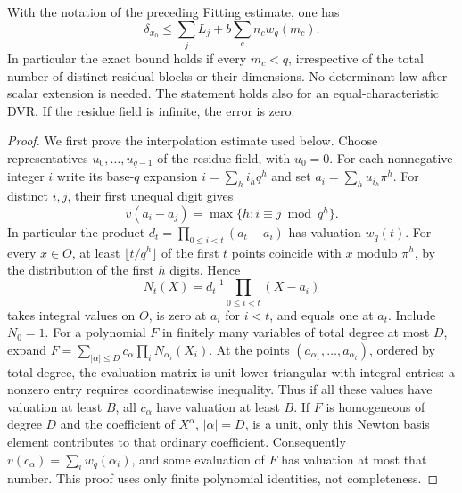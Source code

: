 \begin{theorem}
\label{thm:fitting-multiplicity}
With the notation of the preceding Fitting estimate, one has
\[
 \delta_{x_0}\le\sum_j L_j+
                   b\sum_c n_c w_q(m_c).                 \tag{MF1}
\]
In particular the exact bound holds if every \(m_c<q\), irrespective
of the total number of distinct residual blocks or their dimensions.
No determinant law after scalar extension is needed. The statement
holds also for an equal-characteristic DVR. If the residue field
is infinite, the error is zero.
\end{theorem}
\begin{proof}
We first prove the interpolation estimate used below. Choose representatives
\(u_0,\ldots,u_{q-1}\) of the residue field, with \(u_0=0\).
For each nonnegative integer \(i\) write its base-\(q\) expansion
\(i=\sum_h i_hq^h\) and set \(a_i=\sum_h u_{i_h}\pi^h\).
For distinct \(i,j\), their first unequal digit gives
\[
 v(a_i-a_j)=\max\{h:i\equiv j\bmod q^h\}.
\]
In particular the product \(d_t=\prod_{0\le i<t}(a_t-a_i)\)
has valuation \(w_q(t)\).
For every \(x\in O\), at least \(\lfloor t/q^h\rfloor\) of the first
\(t\) points coincide with \(x\) modulo \(\pi^h\), by the
distribution of the first \(h\) digits. Hence
\[
 N_t(X)=d_t^{-1}\prod_{0\le i<t}(X-a_i)
\]
takes integral values on \(O\), is zero at \(a_i\) for \(i<t\),
and equals one at \(a_t\). Include \(N_0=1\).
For a polynomial \(F\) in finitely many variables of total degree
at most \(D\), expand \(F=\sum_{|\alpha|\le D}
c_\alpha\prod_i N_{\alpha_i}(X_i)\). At the points
\((a_{\alpha_1},\ldots,a_{\alpha_t})\), ordered by total degree,
the evaluation matrix is unit lower triangular with integral
entries: a nonzero entry requires coordinatewise inequality.
Thus if all these values have valuation at least \(B\), all
\(c_\alpha\) have valuation at least \(B\).
If \(F\) is homogeneous of degree \(D\) and the coefficient of
\(X^\alpha\), \(|\alpha|=D\), is a unit, only this Newton basis
element contributes to that ordinary coefficient. Consequently
\(v(c_\alpha)=\sum_i w_q(\alpha_i)\), and some evaluation of \(F\)
has valuation at most that number. This proof uses only finite
polynomial identities, not completeness.


\end{proof}
